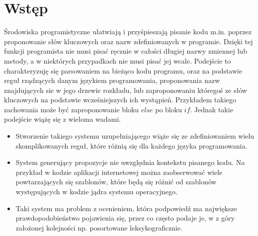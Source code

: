 \newpage %
\section{Wstęp}
\label{sec:intro}
Środowiska programistyczne ułatwiają i przyśpieszają pisanie kodu m.in. poprzez proponowanie 
słów kluczowych oraz nazw zdefiniowanych w programie. Dzięki tej funkcji programista nie musi pisać ręcznie 
w całości długiej nazwy zmiennej lub metody, a w niektórych przypadkach nie musi pisać jej wcale. 
Podejście to charakteryzuję się parsowaniem na bieżąco kodu programu, oraz na podstawie reguł rządzących danym 
językiem programowania, proponowania nazw znajdujących sie w jego drzewie rozkładu, lub zaproponowaniu któregoś 
ze słów kluczowych na podstawie wcześniejszych ich wystąpień. Przykładem takiego zachowania może być zaproponowanie 
bloku \begin{math}else\end{math} po bloku \begin{math}if\end{math}. 
Jednak takie podejście wiążę się z wieloma wadami.
\begin{itemize}
	\item Stworzenie takiego systemu uzupełniającego wiąże się ze zdefiniowaniem wielu skomplikowanych
	reguł, które różnią się dla każdego języka programowania. 
	\item System generujący propozycje nie uwzględnia kontekstu pisanego kodu. Na przykład w kodzie 
	aplikacji internetowej można zaobserwować wiele powtarzających się szablonów, które będą się różnić 
	od szablonów występujących w kodzie jądra systemu operacyjnego. 
	\item Taki system ma problem z ocenieniem, która podpowiedź ma największe prawdopodobieństwo
	pojawienia się, przez co często podaje je, w z góry założonej kolejności np. posortowane leksykograficznie. 
\end{itemize}
